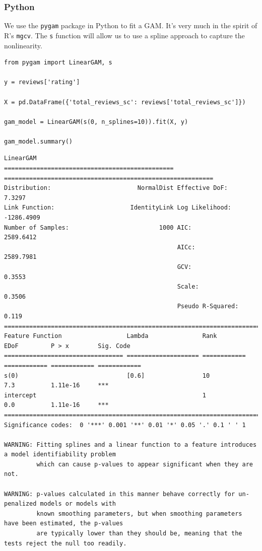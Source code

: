 \documentclass[
  letterpaper,
]{krantz}
\begin{document}
\subsubsection{Python}

We use the \texttt{pygam} package in Python to fit a GAM. It's very much
in the spirit of R's \texttt{mgcv}. The \texttt{s} function will allow
us to use a spline approach to capture the nonlinearity.

\begin{verbatim}
from pygam import LinearGAM, s

y = reviews['rating']

X = pd.DataFrame({'total_reviews_sc': reviews['total_reviews_sc']})

gam_model = LinearGAM(s(0, n_splines=10)).fit(X, y)

gam_model.summary()
\end{verbatim}

\begin{verbatim}
LinearGAM                                                                                                 
=============================================== ==========================================================
Distribution:                        NormalDist Effective DoF:                                      7.3297
Link Function:                     IdentityLink Log Likelihood:                                 -1286.4909
Number of Samples:                         1000 AIC:                                             2589.6412
                                                AICc:                                            2589.7981
                                                GCV:                                                0.3553
                                                Scale:                                              0.3506
                                                Pseudo R-Squared:                                    0.119
==========================================================================================================
Feature Function                  Lambda               Rank         EDoF         P > x        Sig. Code   
================================= ==================== ============ ============ ============ ============
s(0)                              [0.6]                10           7.3          1.11e-16     ***         
intercept                                              1            0.0          1.11e-16     ***         
==========================================================================================================
Significance codes:  0 '***' 0.001 '**' 0.01 '*' 0.05 '.' 0.1 ' ' 1

WARNING: Fitting splines and a linear function to a feature introduces a model identifiability problem
         which can cause p-values to appear significant when they are not.

WARNING: p-values calculated in this manner behave correctly for un-penalized models or models with
         known smoothing parameters, but when smoothing parameters have been estimated, the p-values
         are typically lower than they should be, meaning that the tests reject the null too readily.
\end{verbatim}
\end{document}
